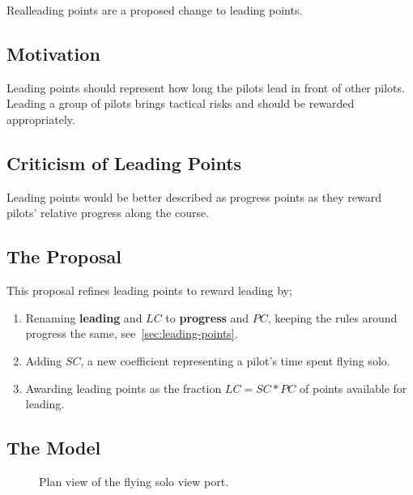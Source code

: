 \documentclass[gap.tex]{subfiles}
\begin{document}
\label{sec:real-leading}
Real\footnotemark leading points are a proposed change to leading points.

\subsection{Motivation}
Leading points should represent how long the pilots lead in front of other
pilots. Leading a group of pilots brings tactical risks and should be rewarded
appropriately.

\subsection{Criticism of Leading Points}
Leading points would be better described as progress points as they reward
pilots' relative progress along the course.

\subsection{The Proposal}
This proposal refines leading points to reward leading by;

\begin{enumerate}
    \item Renaming \textbf{leading} and \(LC\) to \textbf{progress} and \(PC\),
        keeping the rules around progress the same,
        see~\ref{sec:leading-points}.

    \item Adding \(SC\), a new coefficient representing a pilot's time spent
        flying solo.

    \item Awarding leading points as the fraction \(LC = SC * PC\) of points
        available for leading.
\end{enumerate}

\subsection{The Model}

\begin{figure}[ht]
    \centering
    
    \caption{Plan view of the flying solo view port.}
    \label{fig:view-port}
\end{figure}
\end{document}
